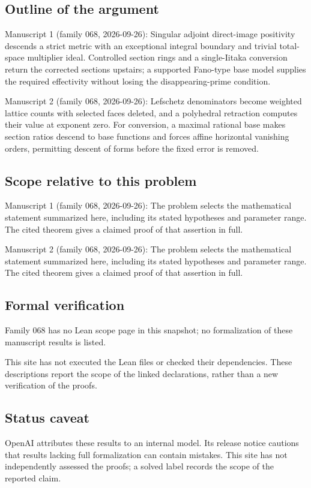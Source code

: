 \documentclass[11pt]{article}
\begin{document}
\subsection{Outline of the argument}
Manuscript 1 (family 068, 2026-09-26): Singular adjoint direct-image positivity descends a strict metric with an exceptional integral boundary and trivial total-space multiplier ideal. Controlled section rings and a single-Iitaka conversion return the corrected sections upstairs; a supported Fano-type base model supplies the required effectivity without losing the disappearing-prime condition.

Manuscript 2 (family 068, 2026-09-26): Lefschetz denominators become weighted lattice counts with selected faces deleted, and a polyhedral retraction computes their value at exponent zero. For conversion, a maximal rational base makes section ratios descend to base functions and forces affine horizontal vanishing orders, permitting descent of forms before the fixed error is removed.

\subsection{Scope relative to this problem}
Manuscript 1 (family 068, 2026-09-26): The problem selects the mathematical statement summarized here, including its stated hypotheses and parameter range. The cited theorem gives a claimed proof of that assertion in full.

Manuscript 2 (family 068, 2026-09-26): The problem selects the mathematical statement summarized here, including its stated hypotheses and parameter range. The cited theorem gives a claimed proof of that assertion in full.

\subsection{Formal verification}
Family 068 has no Lean scope page in this snapshot; no formalization of these manuscript results is listed.

This site has not executed the Lean files or checked their dependencies. These descriptions report the scope of the linked declarations, rather than a new verification of the proofs.

\subsection{Status caveat}
OpenAI attributes these results to an internal model. Its release notice cautions that results lacking full formalization can contain mistakes. This site has not independently assessed the proofs; a solved label records the scope of the reported claim.
\end{document}
